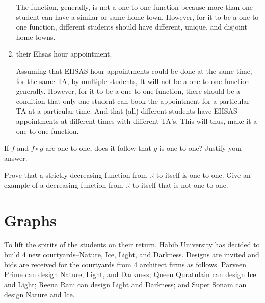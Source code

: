 \documentclass[addpoints]{exam}
\begin{document}
\begin{questions}
\begin{enumerate}[label=\alph*)]
    \begin{solution}
      The function, generally, is not a one-to-one function because more than one student can have a similar
      \newline or same home town.
      \newline However, for it to be a one-to-one function, different students should have different, unique, and disjoint home towns.
    \end{solution}
  \item their Ehsas hour appointment.
    \begin{solution}
      Assuming that EHSAS hour appointments could be done at the same time, for the same TA, by multiple students,
      \newline It will not be a one-to-one function generally.
      \newline However, for it to be a one-to-one function, there should be a condition that only one student can book the appointment for a 
      \newline particular TA at a particular time. And that (all) different students have EHSAS appointments at different times with different TA's. 
      \newline This will thus, make it a one-to-one function.
    \end{solution}
  \end{enumerate}


\question[5] If $f$ and $f \circ g$ are one-to-one, does it follow that $g$ is one-to-one? Justify your answer.
  \begin{solution}
  \end{solution}

\question[5] Prove that a strictly decreasing function from $\mathbb{R}$ to itself is one-to-one. Give an example of a decreasing function from $\mathbb{R}$ to itself that is not one-to-one.
  \begin{solution}
  \end{solution}
  
  \section*{Graphs}
  
\question To lift the spirits of the students on their return, Habib University has decided to build 4 new courtyards--Nature, Ice, Light, and Darkness. Designs are invited and bids are received for the courtyards from 4 architect firms as follows. Parveen Prime can design Nature, Light, and Darkness; Queen Quratulain can design Ice and Light; Reena Rani can design Light and Darkness; and Super Sonam can design Nature and Ice.
  \begin{parts}

\end{parts}
\end{questions}
\end{document}
